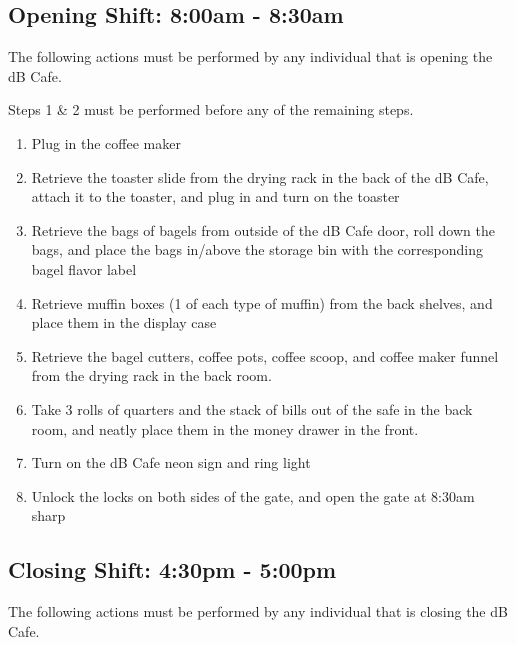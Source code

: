 \documentclass[12pt,onecolumn,letterpaper]{article}
\begin{document}
\subsection{Opening Shift: 8:00am - 8:30am}
The following actions must be performed by any individual that is opening the dB Cafe.

Steps 1 \& 2 must be performed before any of the remaining steps.
\begin{enumerate}
\item Plug in the coffee maker
\item Retrieve the toaster slide from the drying rack in the back of the dB Cafe, attach it to the toaster, and plug in and turn on the toaster 
\item Retrieve the bags of bagels from outside of the dB Cafe door, roll down the bags, and place the bags in/above the storage bin with the corresponding bagel flavor label
\item Retrieve muffin boxes (1 of each type of muffin) from the back shelves, and place them in the display case
\item Retrieve the bagel cutters, coffee pots, coffee scoop, and coffee maker funnel from the drying rack in the back room.
\item Take 3 rolls of quarters and the stack of bills out of the safe in the back room, and neatly place them in the money drawer in the front.
\item Turn on the dB Cafe neon sign and ring light
\item Unlock the locks on both sides of the gate, and open the gate at 8:30am sharp
\end{enumerate}
\subsection{Closing Shift: 4:30pm - 5:00pm}
The following actions must be performed by any individual that is closing the dB Cafe.
\end{document}
